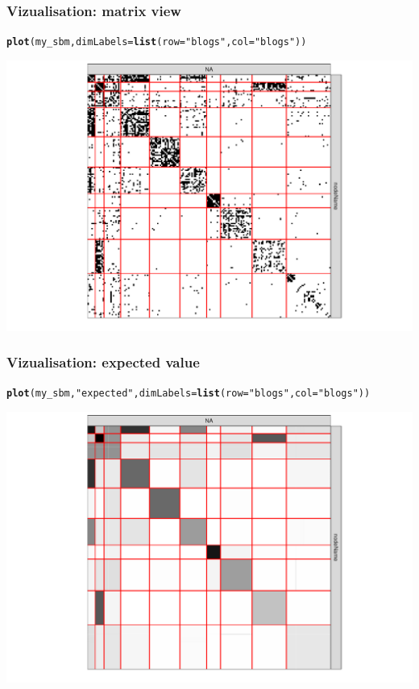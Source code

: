 \documentclass{beamer}\usepackage[]{graphicx}\usepackage[]{color}
\makeatletter
\newcommand{\hlstr}[1]{\textcolor[rgb]{0.192,0.494,0.8}{#1}}%
\newcommand{\hlstd}[1]{\textcolor[rgb]{0.345,0.345,0.345}{#1}}%
\newcommand{\hlkwc}[1]{\textcolor[rgb]{0.333,0.667,0.333}{#1}}%
\newcommand{\hlkwd}[1]{\textcolor[rgb]{0.737,0.353,0.396}{\textbf{#1}}}%
\newenvironment{kframe}{%
 \def\at@end@of@kframe{}%
 \ifinner\ifhmode%
  \def\at@end@of@kframe{\end{minipage}}%
  \begin{minipage}{\columnwidth}%
 \fi\fi%
 \def\FrameCommand##1{\hskip\@totalleftmargin \hskip-\fboxsep
 \colorbox{shadecolor}{##1}\hskip-\fboxsep
     \hskip-\linewidth \hskip-\@totalleftmargin \hskip\columnwidth}%
 \MakeFramed {\advance\hsize-\width
   \@totalleftmargin\z@ \linewidth\hsize
   \@setminipage}}%
 {\par\unskip\endMakeFramed%
 \at@end@of@kframe}
\newenvironment{knitrout}{}{} %
\makeatother
\begin{document}
\begin{frame}[fragile]
  \frametitle{Vizualisation: matrix view}

\begin{knitrout}\scriptsize
{}\color{fgcolor}\begin{kframe}
\begin{alltt}
\hlkwd{plot}\hlstd{(my_sbm,} \hlkwc{dimLabels} \hlstd{=} \hlkwd{list}\hlstd{(}\hlkwc{row} \hlstd{=} \hlstr{"blogs"}\hlstd{,} \hlkwc{col} \hlstd{=} \hlstr{"blogs"}\hlstd{))}
\end{alltt}
\end{kframe}
\includegraphics[width=.8\textwidth]{figures/unnamed-chunk-15-1} 
\end{knitrout}

\end{frame}

\begin{frame}[fragile]
  \frametitle{Vizualisation: expected value}

\begin{knitrout}\scriptsize
{}\color{fgcolor}\begin{kframe}
\begin{alltt}
\hlkwd{plot}\hlstd{(my_sbm,} \hlstr{"expected"}\hlstd{,} \hlkwc{dimLabels} \hlstd{=} \hlkwd{list}\hlstd{(}\hlkwc{row} \hlstd{=} \hlstr{"blogs"}\hlstd{,} \hlkwc{col} \hlstd{=} \hlstr{"blogs"}\hlstd{))}
\end{alltt}
\end{kframe}
\includegraphics[width=.8\textwidth]{figures/unnamed-chunk-16-1} 
\end{knitrout}

\end{frame}
\end{document}
